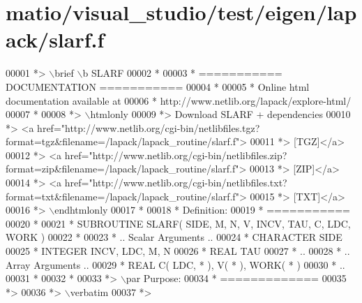 \hypertarget{matio_2visual__studio_2test_2eigen_2lapack_2slarf_8f_source}{}\section{matio/visual\+\_\+studio/test/eigen/lapack/slarf.f}
\label{matio_2visual__studio_2test_2eigen_2lapack_2slarf_8f_source}

\begin{DoxyCode}
00001 \textcolor{comment}{*> \(\backslash\)brief \(\backslash\)b SLARF}
00002 \textcolor{comment}{*}
00003 \textcolor{comment}{*  =========== DOCUMENTATION ===========}
00004 \textcolor{comment}{*}
00005 \textcolor{comment}{* Online html documentation available at }
00006 \textcolor{comment}{*            http://www.netlib.org/lapack/explore-html/ }
00007 \textcolor{comment}{*}
00008 \textcolor{comment}{*> \(\backslash\)htmlonly}
00009 \textcolor{comment}{*> Download SLARF + dependencies }
00010 \textcolor{comment}{*> <a
       href="http://www.netlib.org/cgi-bin/netlibfiles.tgz?format=tgz&filename=/lapack/lapack\_routine/slarf.f"> }
00011 \textcolor{comment}{*> [TGZ]</a> }
00012 \textcolor{comment}{*> <a
       href="http://www.netlib.org/cgi-bin/netlibfiles.zip?format=zip&filename=/lapack/lapack\_routine/slarf.f"> }
00013 \textcolor{comment}{*> [ZIP]</a> }
00014 \textcolor{comment}{*> <a
       href="http://www.netlib.org/cgi-bin/netlibfiles.txt?format=txt&filename=/lapack/lapack\_routine/slarf.f"> }
00015 \textcolor{comment}{*> [TXT]</a>}
00016 \textcolor{comment}{*> \(\backslash\)endhtmlonly }
00017 \textcolor{comment}{*}
00018 \textcolor{comment}{*  Definition:}
00019 \textcolor{comment}{*  ===========}
00020 \textcolor{comment}{*}
00021 \textcolor{comment}{*       SUBROUTINE SLARF( SIDE, M, N, V, INCV, TAU, C, LDC, WORK )}
00022 \textcolor{comment}{* }
00023 \textcolor{comment}{*       .. Scalar Arguments ..}
00024 \textcolor{comment}{*       CHARACTER          SIDE}
00025 \textcolor{comment}{*       INTEGER            INCV, LDC, M, N}
00026 \textcolor{comment}{*       REAL               TAU}
00027 \textcolor{comment}{*       ..}
00028 \textcolor{comment}{*       .. Array Arguments ..}
00029 \textcolor{comment}{*       REAL               C( LDC, * ), V( * ), WORK( * )}
00030 \textcolor{comment}{*       ..}
00031 \textcolor{comment}{*  }
00032 \textcolor{comment}{*}
00033 \textcolor{comment}{*> \(\backslash\)par Purpose:}
00034 \textcolor{comment}{*  =============}
00035 \textcolor{comment}{*>}
00036 \textcolor{comment}{*> \(\backslash\)verbatim}
00037 \textcolor{comment}{*>}

\end{DoxyCode}

